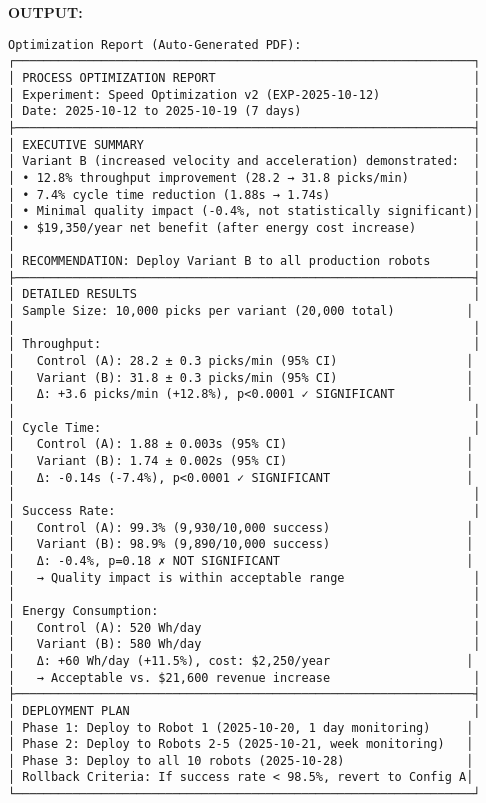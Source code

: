 \documentclass[
]{article}
\begin{document}
\textbf{OUTPUT:}

\begin{verbatim}
Optimization Report (Auto-Generated PDF):
┌────────────────────────────────────────────────────────────────┐
│ PROCESS OPTIMIZATION REPORT                                    │
│ Experiment: Speed Optimization v2 (EXP-2025-10-12)             │
│ Date: 2025-10-12 to 2025-10-19 (7 days)                        │
├────────────────────────────────────────────────────────────────┤
│ EXECUTIVE SUMMARY                                              │
│ Variant B (increased velocity and acceleration) demonstrated:  │
│ • 12.8% throughput improvement (28.2 → 31.8 picks/min)         │
│ • 7.4% cycle time reduction (1.88s → 1.74s)                    │
│ • Minimal quality impact (-0.4%, not statistically significant)│
│ • $19,350/year net benefit (after energy cost increase)        │
│                                                                │
│ RECOMMENDATION: Deploy Variant B to all production robots      │
├────────────────────────────────────────────────────────────────┤
│ DETAILED RESULTS                                               │
│ Sample Size: 10,000 picks per variant (20,000 total)          │
│                                                                │
│ Throughput:                                                    │
│   Control (A): 28.2 ± 0.3 picks/min (95% CI)                  │
│   Variant (B): 31.8 ± 0.3 picks/min (95% CI)                  │
│   Δ: +3.6 picks/min (+12.8%), p<0.0001 ✓ SIGNIFICANT          │
│                                                                │
│ Cycle Time:                                                    │
│   Control (A): 1.88 ± 0.003s (95% CI)                         │
│   Variant (B): 1.74 ± 0.002s (95% CI)                         │
│   Δ: -0.14s (-7.4%), p<0.0001 ✓ SIGNIFICANT                   │
│                                                                │
│ Success Rate:                                                  │
│   Control (A): 99.3% (9,930/10,000 success)                   │
│   Variant (B): 98.9% (9,890/10,000 success)                   │
│   Δ: -0.4%, p=0.18 ✗ NOT SIGNIFICANT                          │
│   → Quality impact is within acceptable range                  │
│                                                                │
│ Energy Consumption:                                            │
│   Control (A): 520 Wh/day                                      │
│   Variant (B): 580 Wh/day                                      │
│   Δ: +60 Wh/day (+11.5%), cost: $2,250/year                   │
│   → Acceptable vs. $21,600 revenue increase                    │
├────────────────────────────────────────────────────────────────┤
│ DEPLOYMENT PLAN                                                │
│ Phase 1: Deploy to Robot 1 (2025-10-20, 1 day monitoring)     │
│ Phase 2: Deploy to Robots 2-5 (2025-10-21, week monitoring)   │
│ Phase 3: Deploy to all 10 robots (2025-10-28)                 │
│ Rollback Criteria: If success rate < 98.5%, revert to Config A│
└────────────────────────────────────────────────────────────────┘


\end{verbatim}
\end{document}

